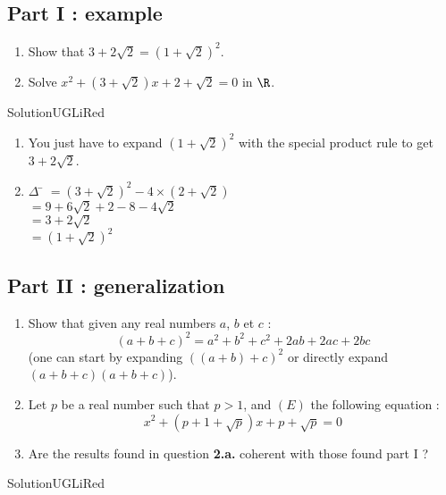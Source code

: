 \documentclass[12pt,a4paper,article,english,firamath]{nsi}
\begin{document}
\subsection*{Part I : example}
\begin{enumerate}
    \item 	Show that $3+2\sqrt{2}=\left(1+\sqrt{2}\right)^2$.
    \item 	Solve $x^2+\left(3+\sqrt{2}\right)x+2+\sqrt{2}=0$ in $\R$.
\end{enumerate}

\begin{encadrecolore}{Solution}{UGLiRed}
    \begin{enumerate}
        \item 	You just have to expand $\left(1+\sqrt{2}\right)^2$ with the special product rule to get $3+2\sqrt{2}$.
        \item 	\begin{tabbing}
            $ \Delta $ 	\= $= \left(3+\sqrt{2}\right)^2-4\times(2+\sqrt{2})$ \\[.7em]
                 \> $= 9+6\sqrt{2}+2-8-4\sqrt{2}$ \\[.7em]
                 \> $= 3+2\sqrt{2}$ \\[.7em]
                 \> $= \left(1+\sqrt{2}\right)^2$ \\[.7em]
        \end{tabbing}
    \end{enumerate}
    
\end{encadrecolore}

\subsection*{Part II : generalization}
\begin{enumerate}
    \item 	Show that given any real numbers $a$, $b$ et $c$ :
            $$\left(a+b+c\right)^2=a^2+b^2+c^2+2ab+2ac+2bc$$
            (one can start by expanding $\left(\left(a+b\right)+c\right)^2$ or directly expand  $\left(a+b+c\right)\left(a+b+c\right)$).
    \item 	Let $p$ be a real number such that $p>1$, and $(E)$ the following equation :
            $$x^2+\left(p+1+\sqrt{p}\right)x+p+\sqrt{p}=0$$
    \item 	Are the results found in question \textbf{2.a.} coherent with those found part I ?
\end{enumerate}

\begin{encadrecolore}{Solution}{UGLiRed}
\end{encadrecolore}
\end{document}
